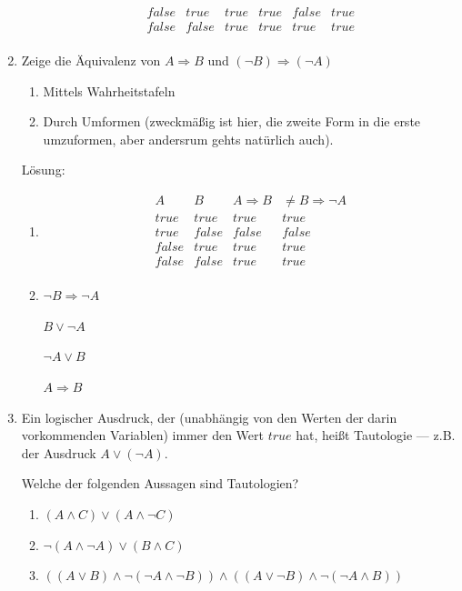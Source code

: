 \documentclass[main.tex]{subfiles}
\begin{document}
\begin{enumerate}
\begin{enumerate}
\[\begin{array}{cccccc}
				            false & true  & true             & true   & false  & true               \\
				            false & false & true             & true   & true   & true               \\
			            \end{array}
		            \]
	      \end{enumerate}
	\item Zeige die Äquivalenz von \( A \Rightarrow B \) und \( (\neg B) \Rightarrow (\neg A) \)
	      \begin{enumerate}
		      \item Mittels Wahrheitstafeln
		      \item Durch Umformen (zweckmäßig ist hier, die zweite Form in die erste umzuformen,
		            aber andersrum gehts natürlich auch).
	      \end{enumerate}

	      Lösung:
	      \begin{enumerate}
		      \item \[
			            \begin{array}{cccc}
				            A     & B     & A \Rightarrow B & \neq B \Rightarrow \neg A \\
				            \hline
				            true  & true  & true            & true                      \\
				            true  & false & false           & false                     \\
				            false & true  & true            & true                      \\
				            false & false & true            & true                      \\
			            \end{array}
		            \]
		      \item \( \neg B \Rightarrow \neg A  \)

		            \( B \lor \neg A  \)

		            \( \neg A \lor B \)

		            \( A \Rightarrow B \)
	      \end{enumerate}
	\item Ein logischer Ausdruck, der (unabhängig von den Werten der darin vorkommenden Variablen)
	      immer den Wert \( true \) hat, heißt Tautologie — z.B. der Ausdruck \( A \lor (\neg A) \).

	      Welche der folgenden Aussagen sind Tautologien?
	      \begin{enumerate}
		      \item \( (A \land C) \lor (A \land \neg C) \)
		      \item \( \neg (A \land \neg A) \lor (B \land C) \)
		      \item \( ((A \lor B) \land \neg (\neg A \land \neg B)) \land
		            ((A \lor \neg B) \land \neg (\neg A \land B)) \)
	      \end{enumerate}


\end{enumerate}
\end{document}
